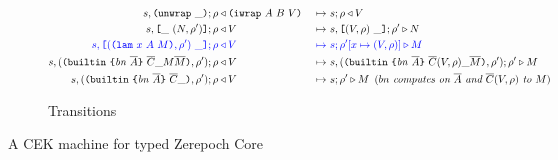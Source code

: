 \documentclass[../zerepoch-core-specification.tex]{subfiles}
\begin{document}
\begin{figure}[!ht]
\begin{subfigure}[c]{\linewidth}
\begin{alignat*}{2}
       s,\texttt{(} \texttt{unwrap} ~ \_ \texttt{)}{}; \rho                   &\triangleleft \texttt{(} \texttt{iwrap} ~ A ~ B ~ V \texttt{)} &~\mapsto~& s;\rho \triangleleft V\\
       s,\texttt{[} \_ ~ (N,\rho^{\prime}) \texttt{]}; \rho   &\triangleleft V &~\mapsto~& s, \texttt{[} (V,\rho) ~ \_ \texttt{]};\rho^{\prime} \triangleright N\\
       \textcolor{blue}{s,\texttt{[} (\texttt{(} \texttt{lam} ~ x ~ A ~ M \texttt{)}, \rho^{\prime}) ~ \_ \texttt{]}; \rho}
                                  &\color{blue}\triangleleft V &~\color{blue}\mapsto~& \textcolor{blue}{s;\rho^{\prime}[x\mapsto (V,\rho)] \triangleright M}\\
       s,  (\texttt{(} \texttt{builtin} ~ \texttt{\{} \mathit{bn} ~ \overline{A} \texttt{\}} ~ \overline{C} \_ M \overline{M} \texttt{)}{}, \rho^{\prime}); \rho
                                  &\triangleleft V &~\mapsto~& s, (\texttt{(} \texttt{builtin} ~ \texttt{\{} \mathit{bn} ~ \overline{A} \texttt{\}} ~ \overline{C}(V,\rho) \_ \overline{M} \texttt{)}, \rho^{\prime});\rho^{\prime} \triangleright M\\
       s,(\texttt{(} \texttt{builtin} ~ \texttt{\{} \mathit{bn} ~ \overline{A} \texttt{\}} ~ \overline{C} \_  \texttt{)}, \rho^{\prime}); \rho&\triangleleft V 
                                                  &~\mapsto~& s;\rho^{\prime} \triangleright M \enspace (\textit{$bn$ computes on $\overline{A}$ and $\overline{C}(V,\rho)$ to $M$})\\
\end{alignat*}
\caption{Transitions}
\end{subfigure}
\caption{A CEK machine for typed Zerepoch Core}
\label{fig:cek-machine}
\end{figure}
\end{document}
